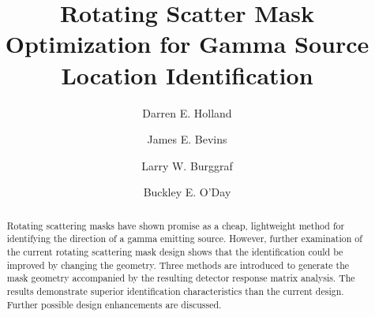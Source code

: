 \documentclass[3p,times]{elsarticle}
\begin{document}
\begin{frontmatter}



\dochead{}

\title{Rotating Scatter Mask Optimization for Gamma Source Location Identification}


\author[d1]{Darren E. Holland}
\author[d2]{James E. Bevins}
\author[d3]{Larry W. Burggraf}
\author[d4]{Buckley E. O'Day}

\address[d1]{dholland@cedarville.edu\\
  Department of Mechanical Engineering\\
	Cedarville University \\
	Cedarville, OH\\}
	
\address[d2.d3,d4]{Department of Engineering Physics\\
	Air Force Institute of Technology \\
	Wright-Patterson AFB, OH\\}

\begin{abstract}
Rotating scattering masks have shown promise as a cheap, lightweight method for identifying the direction of a gamma emitting source.
However, further examination of the current rotating scattering mask design shows that the identification could be improved by changing the geometry.  
Three methods are introduced to generate the mask geometry accompanied by the resulting detector response matrix analysis.  
The results demonstrate superior identification characteristics than the current design.  
Further possible design enhancements are discussed.
\end{abstract}


\end{frontmatter}
\end{document}
